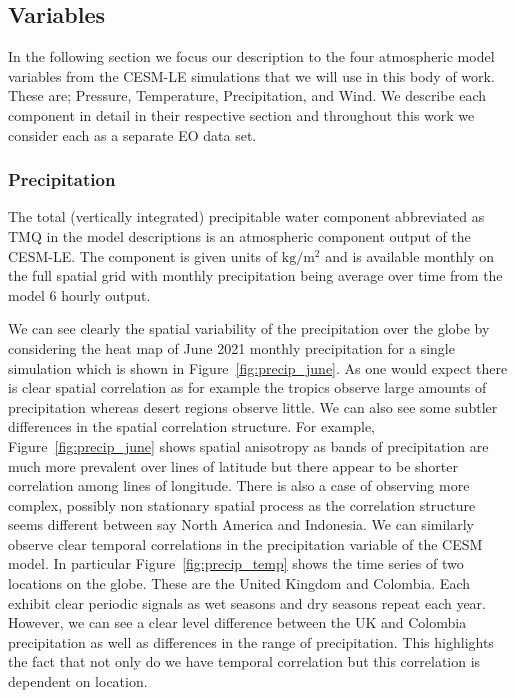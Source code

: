  \subsection{Variables \label{ssec:variables}}
 In the following section we focus our description to the four atmospheric model variables from the  CESM-LE simulations that we will use in this body of work.
 These are; Pressure, Temperature, Precipitation, and Wind.
 We describe each component in detail in their respective section and throughout this work we consider each as a separate EO data set. 

\subsubsection{Precipitation \label{sssec:precip}}
The total (vertically integrated) precipitable water component abbreviated as TMQ in the model descriptions is an atmospheric component output of the CESM-LE.
The component is given units of $\si{\kilogram\per\metre\squared} $ and is available monthly on the full spatial grid with monthly precipitation being average over time from the model 6 hourly output. 

We can see clearly the spatial variability of the precipitation over the globe by considering the heat map of June 2021 monthly precipitation for a single simulation which is shown in Figure~\ref{fig:precip_june}. 
As one would expect there is clear spatial correlation as for example the tropics observe large amounts of precipitation whereas desert regions observe little. 
We can also see some subtler differences in the spatial correlation structure. 
For example, Figure~\ref{fig:precip_june} shows spatial anisotropy as bands of precipitation are much more prevalent over lines of latitude but there appear to be shorter correlation among lines of longitude.
There is also a case of observing more complex, possibly non stationary spatial process as the correlation structure seems different between say North America and Indonesia. 
We can similarly observe clear temporal correlations in the precipitation variable of the CESM model.
In particular Figure~\ref{fig:precip_temp} shows the time series of two locations on the globe.
These are the United Kingdom and Colombia.
Each exhibit clear periodic signals as wet seasons and dry seasons repeat each year.
However, we can see a clear level difference between the UK and Colombia precipitation as well as differences in the range of precipitation.
This highlights the fact that not only do we have temporal correlation but this correlation is dependent on location. 


